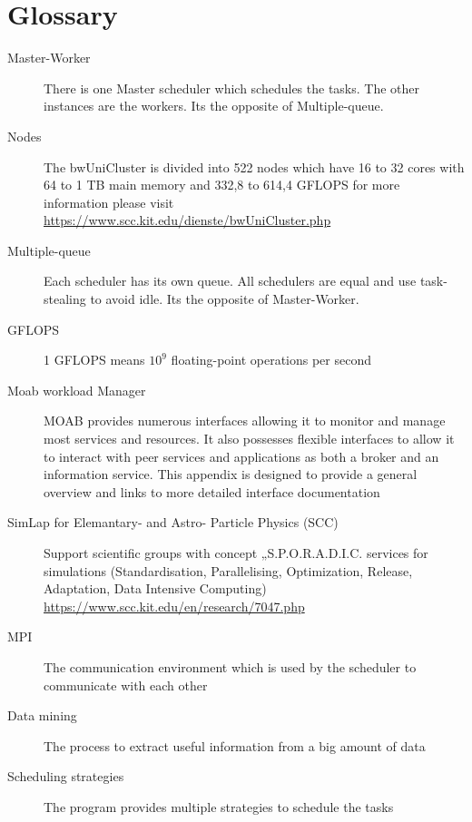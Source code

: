\section{Glossary}
\begin{description}
	\item[Master-Worker] There is one Master scheduler which schedules the tasks. The other instances are the workers. Its the opposite of Multiple-queue.

	\item[Nodes] The bwUniCluster is divided into 522 nodes which have 16 to 32 cores with 64 to 1 TB main memory and 332,8 to 614,4 GFLOPS for more information please visit \href{https://www.scc.kit.edu/dienste/bwUniCluster.php}{https://www.scc.kit.edu/dienste/bwUniCluster.php}

	\item[Multiple-queue]Each scheduler has its own queue. All schedulers are equal and use task-stealing to avoid idle. Its the opposite of Master-Worker.

	\item[GFLOPS] 1 GFLOPS means $10^9$ floating-point operations per second

	\item[Moab workload Manager] MOAB provides numerous interfaces allowing it to monitor and manage most services and resources. It also possesses flexible interfaces to allow it to interact with peer services and applications as both a broker and an information service. This appendix is designed to provide a general overview and links to more detailed interface documentation

	\item [SimLap for Elemantary- and Astro-    Particle Physics (SCC)] Support scientific groups with concept „S.P.O.R.A.D.I.C. services for simulations (Standardisation, Parallelising, Optimization, Release, Adaptation, Data Intensive Computing) \href {https://www.scc.kit.edu/en/research/7047.php}{https://www.scc.kit.edu/en/research/7047.php}

	\item[MPI] The communication environment which is used by the scheduler to communicate with each other 

	\item[Data mining] The process to extract useful information from a big amount of data

	\item[Scheduling strategies] The program provides multiple strategies to schedule the tasks


\end{description}
